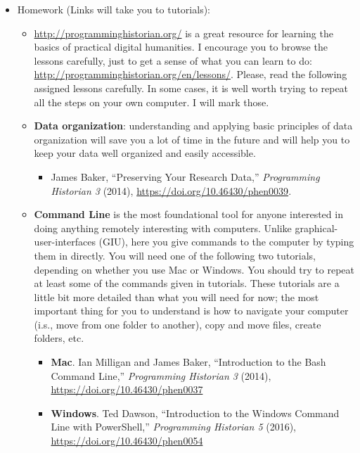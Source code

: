 \documentclass[
]{book}
\providecommand{\tightlist}{%
  \setlength{\itemsep}{0pt}\setlength{\parskip}{0pt}}
\begin{document}
\begin{itemize}
\tightlist
\item
  Homework (Links will take you to tutorials):

  \begin{itemize}
  \tightlist
  \item
    \url{http://programminghistorian.org/} is a great resource for learning the basics of practical digital humanities. I encourage you to browse the lessons carefully, just to get a sense of what you can learn to do: \url{http://programminghistorian.org/en/lessons/}. Please, read the following assigned lessons carefully. In some cases, it is well worth trying to repeat all the steps on your own computer. I will mark those.
  \item
    \textbf{Data organization}: understanding and applying basic principles of data organization will save you a lot of time in the future and will help you to keep your data well organized and easily accessible.

    \begin{itemize}
    \tightlist
    \item
      James Baker, ``Preserving Your Research Data,'' \emph{Programming Historian 3} (2014), \url{https://doi.org/10.46430/phen0039}.
    \end{itemize}
  \item
    \textbf{Command Line} is the most foundational tool for anyone interested in doing anything remotely interesting with computers. Unlike graphical-user-interfaces (GIU), here you give commands to the computer by typing them in directly. You will need one of the following two tutorials, depending on whether you use Mac or Windows. You should try to repeat at least some of the commands given in tutorials. These tutorials are a little bit more detailed than what you will need for now; the most important thing for you to understand is how to navigate your computer (i.s., move from one folder to another), copy and move files, create folders, etc.

    \begin{itemize}
    \tightlist
    \item
      \textbf{Mac}. Ian Milligan and James Baker, ``Introduction to the Bash Command Line,'' \emph{Programming Historian 3} (2014), \url{https://doi.org/10.46430/phen0037}
    \item
      \textbf{Windows}. Ted Dawson, ``Introduction to the Windows Command Line with PowerShell,'' \emph{Programming Historian 5} (2016), \url{https://doi.org/10.46430/phen0054}
    \end{itemize}
  \end{itemize}
\end{itemize}
\end{document}
